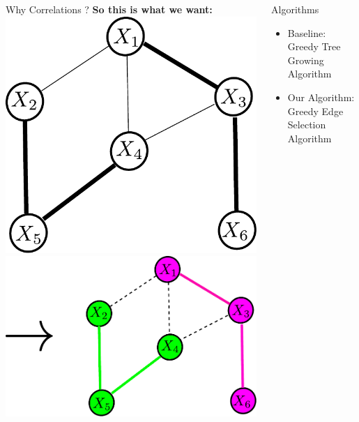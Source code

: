 \documentclass[serif,mathserif,final]{beamer}
\newcommand{\itemlinespace}{0.22in}
\newcommand{\insertlinespace}{\vspace{\itemlinespace}}
\begin{document}
\begin{frame}{}
\begin{columns}[t]
\begin{column}{0.49\linewidth}
\begin{block}{\Huge Why Correlations ?}
{        \textbf{So this is what we want:}  \\
        \insertlinespace
        \hspace{2in} 
        \includegraphics[width=4in]{figs/weighted} \hspace{0.4in}
        \includegraphics[width=6in]{figs/weighted_partition2}
      }
      \end{block}

    \end{column}%

    \begin{column}{0.49\linewidth}
      \begin{block}{\Huge Algorithms}
	    \begin{itemize}
		\huge
	    \item Baseline: Greedy Tree Growing Algorithm
	    \item Our Algorithm: Greedy Edge Selection Algorithm
	\end{itemize}


\end{block}
\end{column}
\end{columns}
\end{frame}
\end{document}
